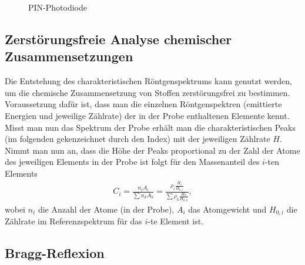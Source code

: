 \begin{figure}[h]
  \centering
  \caption{PIN-Photodiode}
  \label{fig:pin}
\end{figure}

\subsection{Zerstörungsfreie Analyse chemischer Zusammensetzungen}
Die Entstehung des charakteristischen Röntgenspektrums kann genutzt werden, um die chemische Zusammensetzung von Stoffen zerstörungsfrei zu bestimmen. Voraussetzung dafür ist, dass man die einzelnen Röntgenspektren (emittierte Energien und jeweilige Zählrate) der in der Probe enthaltenen Elemente kennt. Misst man nun das Spektrum der Probe erhält man die charakteristischen Peaks (im folgenden gekenzeichnet durch den Index) mit der jeweiligen Zählrate $H$. Nimmt man nun an, dass die Höhe der Peaks proportional zu der Zahl der Atome des jeweiligen Elements in der Probe ist folgt für den Massenanteil des $i$-ten Elements
\begin{align}
  C_i=\frac{n_iA_i}{\sum n_k A_k}=\frac{\rho_i \frac{H_i}{H_{0,i}}}{\sum \rho_k \frac{H_k}{H_{0,k}}},
\end{align}  
wobei $n_i$ die Anzahl der Atome (in der Probe), $A_i$ das Atomgewicht und $H_{0,i}$ die Zählrate im Referenzspektrum für das $i$-te Element ist. 

\subsection{Bragg-Reflexion}
